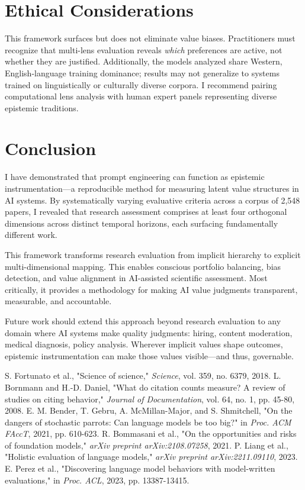 \documentclass{article}
\begin{document}
\section{Ethical Considerations}

This framework surfaces but does not eliminate value biases. Practitioners must recognize that multi-lens evaluation reveals \textit{which} preferences are active, not whether they are justified. Additionally, the models analyzed share Western, English-language training dominance; results may not generalize to systems trained on linguistically or culturally diverse corpora. I recommend pairing computational lens analysis with human expert panels representing diverse epistemic traditions.

\section{Conclusion}

I have demonstrated that prompt engineering can function as epistemic instrumentation—a reproducible method for measuring latent value structures in AI systems. By systematically varying evaluative criteria across a corpus of 2,548 papers, I revealed that research assessment comprises at least four orthogonal dimensions across distinct temporal horizons, each surfacing fundamentally different work.

This framework transforms research evaluation from implicit hierarchy to explicit multi-dimensional mapping. This enables conscious portfolio balancing, bias detection, and value alignment in AI-assisted scientific assessment. Most critically, it provides a methodology for making AI value judgments transparent, measurable, and accountable.

Future work should extend this approach beyond research evaluation to any domain where AI systems make quality judgments: hiring, content moderation, medical diagnosis, policy analysis. Wherever implicit values shape outcomes, epistemic instrumentation can make those values visible—and thus, governable.

\begin{thebibliography}{00}
 S. Fortunato et al., "Science of science," \textit{Science}, vol. 359, no. 6379, 2018.
 L. Bornmann and H.-D. Daniel, "What do citation counts measure? A review of studies on citing behavior," \textit{Journal of Documentation}, vol. 64, no. 1, pp. 45-80, 2008.
 E. M. Bender, T. Gebru, A. McMillan-Major, and S. Shmitchell, "On the dangers of stochastic parrots: Can language models be too big?" in \textit{Proc. ACM FAccT}, 2021, pp. 610-623.
 R. Bommasani et al., "On the opportunities and risks of foundation models," \textit{arXiv preprint arXiv:2108.07258}, 2021.
 P. Liang et al., "Holistic evaluation of language models," \textit{arXiv preprint arXiv:2211.09110}, 2023.
 E. Perez et al., "Discovering language model behaviors with model-written evaluations," in \textit{Proc. ACL}, 2023, pp. 13387-13415.
\end{thebibliography}
\end{document}
